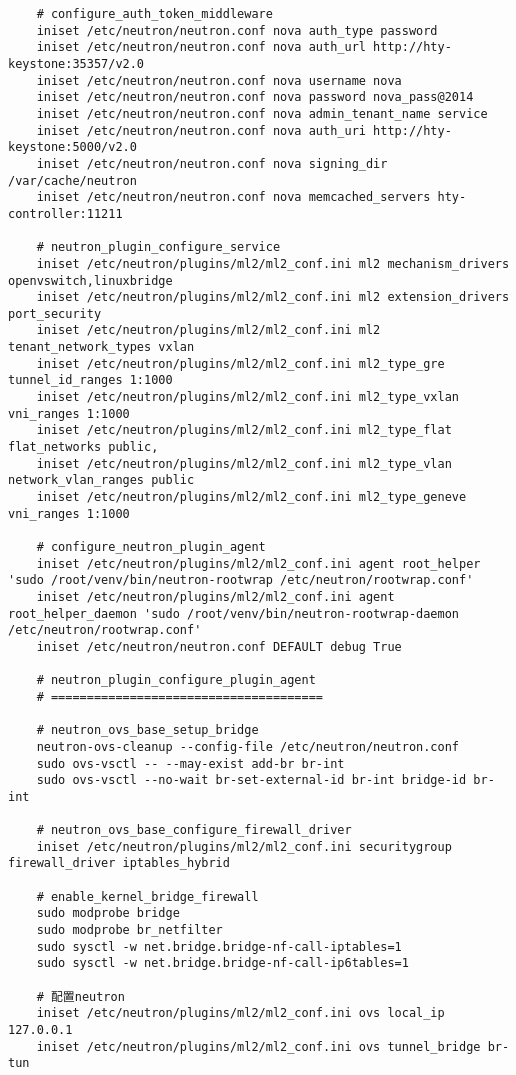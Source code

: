 \documentclass[a4paper,left=1.5cm,right=1.5cm,11pt]{article}
\begin{document}
\begin{lstlisting}
	# configure_auth_token_middleware
	iniset /etc/neutron/neutron.conf nova auth_type password
	iniset /etc/neutron/neutron.conf nova auth_url http://hty-keystone:35357/v2.0	
	iniset /etc/neutron/neutron.conf nova username nova
	iniset /etc/neutron/neutron.conf nova password nova_pass@2014
	iniset /etc/neutron/neutron.conf nova admin_tenant_name service
	iniset /etc/neutron/neutron.conf nova auth_uri http://hty-keystone:5000/v2.0
	iniset /etc/neutron/neutron.conf nova signing_dir /var/cache/neutron
	iniset /etc/neutron/neutron.conf nova memcached_servers hty-controller:11211

	# neutron_plugin_configure_service
	iniset /etc/neutron/plugins/ml2/ml2_conf.ini ml2 mechanism_drivers openvswitch,linuxbridge
	iniset /etc/neutron/plugins/ml2/ml2_conf.ini ml2 extension_drivers port_security
	iniset /etc/neutron/plugins/ml2/ml2_conf.ini ml2 tenant_network_types vxlan
	iniset /etc/neutron/plugins/ml2/ml2_conf.ini ml2_type_gre tunnel_id_ranges 1:1000
	iniset /etc/neutron/plugins/ml2/ml2_conf.ini ml2_type_vxlan vni_ranges 1:1000
	iniset /etc/neutron/plugins/ml2/ml2_conf.ini ml2_type_flat flat_networks public,
	iniset /etc/neutron/plugins/ml2/ml2_conf.ini ml2_type_vlan network_vlan_ranges public
	iniset /etc/neutron/plugins/ml2/ml2_conf.ini ml2_type_geneve vni_ranges 1:1000

	# configure_neutron_plugin_agent
	iniset /etc/neutron/plugins/ml2/ml2_conf.ini agent root_helper 'sudo /root/venv/bin/neutron-rootwrap /etc/neutron/rootwrap.conf'
	iniset /etc/neutron/plugins/ml2/ml2_conf.ini agent root_helper_daemon 'sudo /root/venv/bin/neutron-rootwrap-daemon /etc/neutron/rootwrap.conf'
	iniset /etc/neutron/neutron.conf DEFAULT debug True

	# neutron_plugin_configure_plugin_agent
	# ======================================

	# neutron_ovs_base_setup_bridge
	neutron-ovs-cleanup --config-file /etc/neutron/neutron.conf
	sudo ovs-vsctl -- --may-exist add-br br-int
	sudo ovs-vsctl --no-wait br-set-external-id br-int bridge-id br-int
	
	# neutron_ovs_base_configure_firewall_driver
	iniset /etc/neutron/plugins/ml2/ml2_conf.ini securitygroup firewall_driver iptables_hybrid
	
	# enable_kernel_bridge_firewall
	sudo modprobe bridge
	sudo modprobe br_netfilter
	sudo sysctl -w net.bridge.bridge-nf-call-iptables=1
	sudo sysctl -w net.bridge.bridge-nf-call-ip6tables=1

	# 配置neutron
	iniset /etc/neutron/plugins/ml2/ml2_conf.ini ovs local_ip 127.0.0.1
	iniset /etc/neutron/plugins/ml2/ml2_conf.ini ovs tunnel_bridge br-tun


\end{lstlisting}
\end{document}
